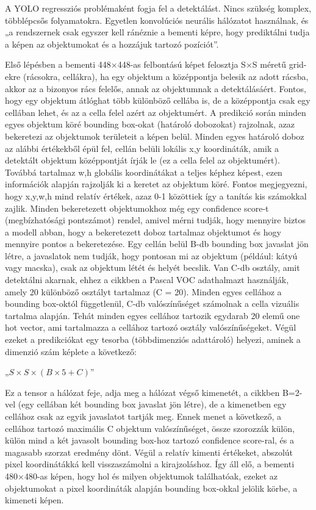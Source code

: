 A YOLO regressziós problémaként fogja fel a detektálást. Nincs szükség
komplex, többlépcsős folyamatokra. Egyetlen konvolúciós neurális
hálózatot használnak, és „a rendszernek csak egyszer kell ránéznie a
bementi képre, hogy prediktálni tudja a képen az objektumokat és a
hozzájuk tartozó pozíciót''. \cite{redmonYouOnlyLook2016}

Első lépésben a bementi 448×448-as felbontású képet felosztja S×S méretű
grid-ekre (rácsokra, cellákra), ha egy objektum a középpontja belesik az
adott rácsba, akkor az a bizonyos rács felelős, annak az objektumnak a
detektálásáért. Fontos, hogy egy objektum átlóghat több különböző
cellába is, de a középpontja csak egy cellában lehet, és az a cella
felel azért az objektumért. A predikció során minden egyes objektum köré
bounding box-okat (határoló dobozokat) rajzolnak, azaz bekeretezi az
objektumok területeit a képen belül. Minden egyes határoló doboz az
alábbi értékekből épül fel, cellán belüli lokális x,y koordináták, amik
a detektált objektum középpontját írják le (ez a cella felel az
objektumért). Továbbá tartalmaz w,h globális koordinátákat a teljes
képhez képest, ezen információk alapján rajzolják ki a keretet az
objektum köré. Fontos megjegyezni, hogy x,y,w,h mind relatív értékek,
azaz 0-1 közöttiek így a tanítás kis számokkal zajlik. Minden
bekeretezett objektumokhoz még egy confidence score-t (megbízhatósági
pontszámot) rendel, amivel mérni tudják, hogy mennyire biztos a modell
abban, hogy a bekeretezett doboz tartalmaz objektumot és hogy mennyire
pontos a bekeretezése. Egy cellán belül B-db bounding box javaslat jön
létre, a javaslatok nem tudják, hogy pontosan mi az objektum (például:
kátyú vagy macska), csak az objektum létét és helyét becslik. Van C-db
osztály, amit detektálni akarnak, ehhez a cikkben a Pascal VOC
adathalmazt használják, amely 20 különböző osztályt tartalmaz (C = 20).
Minden egyes cellához a bounding box-októl függetlenül, C-db
valószínűséget számolnak a cella vizuális tartalma alapján. Tehát minden
egyes cellához tartozik egydarab 20 elemű one hot vector, ami
tartalmazza a cellához tartozó osztály valószínűségeket. Végül ezeket a
predikciókat egy tesorba (többdimenziós adattároló) helyezi, aminek a
dimenzió szám képlete a következő: \cite{redmonYouOnlyLook2016}

„$S \times S \times (B \times 5 + C)$”\cite{redmonYouOnlyLook2016}

Ez a tensor a hálózat feje, adja meg a hálózat végső kimenetét, a
cikkben B=2-vel (egy cellában két bounding box javaslat jön létre), de a
kimenetben egy cellához csak az egyik javaslatot tartják meg. Ennek
menet a következő, a cellához tartozó maximális C objektum
valószínűséget, össze szorozzák külön, külön mind a két javasolt
bounding box-hoz tartozó confidence score-ral, és a magasabb szorzat
eredmény dönt. Végül a relatív kimenti értékeket, abszolút pixel
koordinátákká kell visszaszámolni a kirajzoláshoz. Így áll elő, a
bementi 480×480-as képen, hogy hol és milyen objektumok találhatóak,
ezeket az objektumokat a pixel koordináták alapján bounding box-okkal
jelölik körbe, a kimeneti képen.

